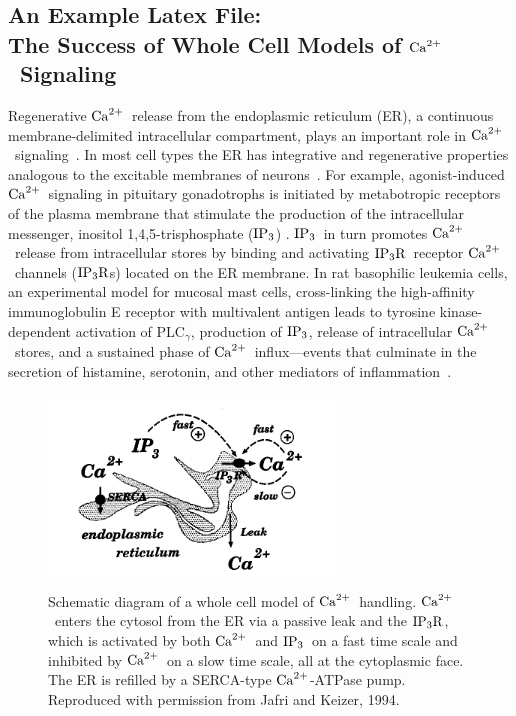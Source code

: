 \documentclass[12pt]{article}
\def\Ca{${\rm Ca}^{2+}$}
\def\Ip{${\rm IP}_{3}$}
\def\Ipr{${\rm IP}_{3}{\rm R}$}
\begin{document}
             

\begin{center}
\section*{\boldmath An Example Latex File: \\
The Success of Whole Cell Models of \Ca\ Signaling}  
\end{center}

Regenerative \Ca\ release from the endoplasmic reticulum (ER), a continuous
membrane-delimited intracellular compartment, plays an important role in \Ca\
signaling\ \cite{Berridge93,Berridge97}.   
In most cell types the ER has integrative and regenerative
properties analogous to the excitable membranes of 
neurons\ \cite{Berridge98,LiEtal95a,KeizerEtal95}.  For example,
agonist-induced \Ca\ signaling in pituitary gonadotrophs is initiated by
metabotropic receptors of the plasma membrane that stimulate the production of
the intracellular messenger, inositol 1,4,5-trisphosphate (\Ip)
\cite{LiEtal94}.  \Ip\ in turn promotes \Ca\ release from intracellular stores
by binding and activating \Ipr\ receptor \Ca\ channels (\Ipr s) located on the
ER membrane.  In rat basophilic leukemia cells, an experimental model for
mucosal mast cells, cross-linking the high-affinity immunoglobulin E receptor
with multivalent antigen leads to tyrosine kinase-dependent 
activation of PLC$_\gamma$, production of \Ip, release of  
intracellular \Ca\ stores, and a sustained phase of \Ca\ influx---events 
that culminate in the secretion of histamine, serotonin,
and other mediators of inflammation\ \cite{WilsonEtal98,SmithEtal96}. 

\begin{figure}[h]
\centerline{\includegraphics[height=2.0in,width=3.0in,angle=0]{FigureA.pdf}}
\caption{Schematic diagram of a whole cell model of \Ca\ handling. \Ca\ enters the
cytosol from the ER via a passive leak and the \Ipr, which is activated by
both \Ca\ and \Ip\ on a fast time scale and inhibited by \Ca\ on a slow time
scale, all at the cytoplasmic face.  The ER is refilled by a SERCA-type
\Ca-ATPase pump.  
Reproduced with permission from Jafri and Keizer, 1994.}
\label{FigureA}
\end{figure}
\end{document}
